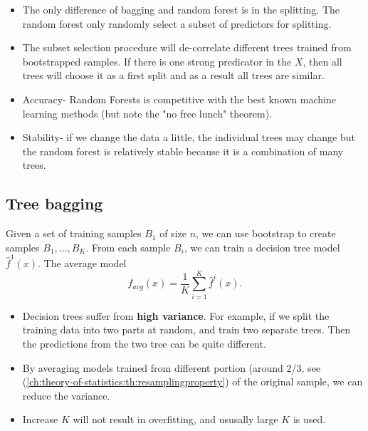 \begin{refsection}
\begin{definition}
\begin{itemize}
	\end{itemize}
	
\end{definition}


\begin{remark}[interpretation]\hfill
	\begin{itemize}
		\item The only difference of bagging and random forest is in the splitting. The random forest only randomly select a subset of predictors for splitting.
		\item The subset selection procedure will de-correlate different trees trained from bootstrapped samples. If there is one strong predicator in the $X$, then all trees will choose it as a first split and as a result all trees are similar. 
	\end{itemize}
\end{remark}

\begin{remark}\hfill
	\begin{itemize}
		\item Accuracy- Random Forests is competitive with the best known
		machine learning methods (but note the "no free lunch"
		theorem).
		\item Stability- if we change the data a little, the individual trees
		may change but the random forest is relatively stable because it is a
		combination of many trees.
	\end{itemize}	
\end{remark}


\subsection{Tree bagging}
\begin{definition}[bagging]
	Given a set of training samples $B_1$ of size $n$, we can use bootstrap to create samples $B_1,...,B_K$. From each sample $B_i$, we can train a decision tree model $\hat{f}^1(x)$. The average model 
	$$\hat{f}_{avg}(x) = \frac{1}{K}\sum_{i=1}^K \hat{f}^i(x).$$
\end{definition}


\begin{remark}\hfill
	\begin{itemize}
		\item Decision trees suffer from \textbf{high variance}. For example, if we split the training data into two parts at random, and train two separate trees. Then the predictions from the two tree can be quite different. 
		\item By averaging models trained from different portion (around 2/3, see (\autoref{ch:theory-of-statistics:th:resamplingproperty}) of the original sample, we can reduce the variance. 
		\item Increase $K$ will not result in overfitting, and ususally large $K$ is used. 
	\end{itemize}
\end{remark}



\end{refsection}
